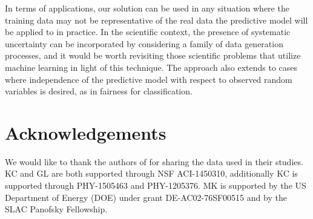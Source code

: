 \documentclass{article}
\theoremstyle{plain}
\begin{document}

In terms of applications, our solution can be used in any situation
where the training data may not be representative of the real data the
predictive model will be applied to in practice. In the scientific context, the
presence of systematic uncertainty can be incorporated by considering a family
of data generation processes, and it would be worth revisiting those scientific problems
that utilize machine learning in light of this technique. The approach
also extends to cases where independence of the predictive model with respect to
observed random variables is desired, as in fairness for
classification.


\section*{Acknowledgements}

We would like to thank the authors of \citep{baldi2016jet} for sharing the data used in their
studies.
KC and GL are both supported through NSF ACI-1450310, additionally KC is supported
through PHY-1505463 and PHY-1205376.  MK is supported by the US
Department of Energy (DOE) under grant DE-AC02-76SF00515 and by the
SLAC Panofsky Fellowship.



\end{document}
